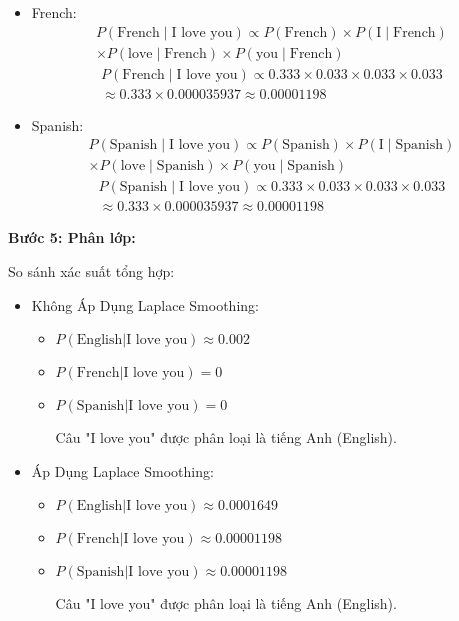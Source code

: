 \begin{itemize}
\begin{itemize}
        \item French:
\begin{multline*}
P(\text{French} \mid \text{I love you}) \propto P(\text{French}) \times P(\text{I} \mid \text{French}) \\
\times P(\text{love} \mid \text{French}) \times P(\text{you} \mid \text{French})
\end{multline*}
\begin{multline*}
P(\text{French} \mid \text{I love you}) \propto 0.333 \times 0.033 \times 0.033 \times 0.033 \\
\approx 0.333 \times 0.000035937 \approx 0.00001198
\end{multline*}

        \item Spanish:
\begin{multline*}
P(\text{Spanish} \mid \text{I love you}) \propto P(\text{Spanish}) \times P(\text{I} \mid \text{Spanish}) \\
\times P(\text{love} \mid \text{Spanish}) \times P(\text{you} \mid \text{Spanish})
\end{multline*}
\begin{multline*}
P(\text{Spanish} \mid \text{I love you}) \propto 0.333 \times 0.033 \times 0.033 \times 0.033 \\
\approx 0.333 \times 0.000035937 \approx 0.00001198
\end{multline*}
    \end{itemize}
\end{itemize}


\textbf{Bước 5: Phân lớp:}  

So sánh xác suất tổng hợp:

\begin{itemize}
    \item Không Áp Dụng Laplace Smoothing:
    \begin{itemize}
        \item \( P(\text{English} | \text{I love you}) \approx 0.002 \)
        \item \( P(\text{French} | \text{I love you}) = 0 \)
        \item \( P(\text{Spanish} | \text{I love you}) = 0 \)
        
Câu "I love you" được phân loại là tiếng Anh (English).

    \end{itemize}
    \item Áp Dụng Laplace Smoothing:
    \begin{itemize}
        \item \( P(\text{English} | \text{I love you}) \approx 0.0001649 \)
        \item \( P(\text{French} | \text{I love you}) \approx 0.00001198 \)
        \item \( P(\text{Spanish} | \text{I love you}) \approx 0.00001198 \)

        Câu "I love you" được phân loại là tiếng Anh (English).
        
    \end{itemize}
\end{itemize}
\clearpage
